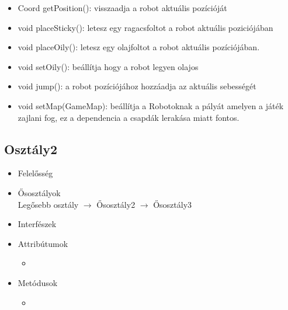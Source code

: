 \begin{itemize}
\begin{itemize}
		\item Coord getPosition(): visszaadja a robot aktuális pozícióját
		\item void placeSticky(): letesz egy ragacsfoltot a robot aktuális poziciójában
		\item void placeOily(): letesz egy olajfoltot a robot aktuális pozíciójában.
		\item void setOily(): beállítja hogy a robot legyen olajos
		\item void jump(): a robot pozíciójához hozzáadja az aktuális sebességét
		\item void setMap(GameMap): beállítja a Robotoknak a pályát amelyen a játék zajlani fog, ez a dependencia a csapdák lerakása miatt fontos.
	\end{itemize}
\end{itemize}

\subsection{Osztály2}
\begin{itemize}
	\item Felelősség\\
	\item Ősosztályok\\
	Legősebb osztály $\rightarrow$ Ősosztály2 $\rightarrow$ Ősosztály3
	\item Interfészek\\
	\item Attribútumok\\
	\begin{itemize}
		\item
	\end{itemize}
	\item Metódusok\\
	\begin{itemize}
		\item
	\end{itemize}
\end{itemize}

